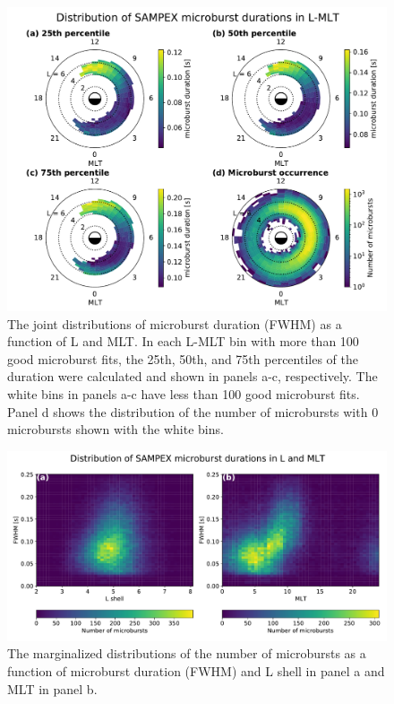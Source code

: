 \documentclass[draft]{agujournal2019}
\begin{document}
\begin{figure}
\noindent\includegraphics[width=\textwidth]{figures/fig2.pdf}
\caption{The joint distributions of microburst duration (FWHM) as a function of L and MLT. In each L-MLT bin with more than 100 good microburst fits, the 25th, 50th, and 75th percentiles of the duration were calculated and shown in panels a-c, respectively. The white bins in panels a-c have less than 100 good microburst fits. Panel d shows the distribution of the number of microbursts with 0 microbursts shown with the white bins.}
\label{fig2}
\end{figure}

\begin{figure}
\noindent\includegraphics[width=\textwidth]{figures/fig3.pdf}
\caption{The marginalized distributions of the number of microbursts as a function of microburst duration (FWHM) and L shell in panel a and MLT in panel b.}
\label{fig3}
\end{figure}
\end{document}
